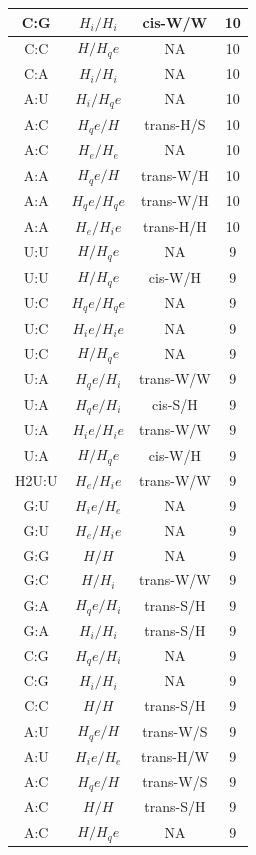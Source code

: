\begin{center}
\begin{longtable}{c|c|c|c}
C:G & $H_i/H_i$ & cis-W/W & 10 \\  \hline
C:C & $H/H_qe$ & NA & 10 \\  \hline
C:A & $H_i/H_i$ & NA & 10 \\  \hline
A:U & $H_i/H_qe$ & NA & 10 \\  \hline
A:C & $H_qe/H$ & trans-H/S & 10 \\  \hline
A:C & $H_e/H_e$ & NA & 10 \\  \hline
A:A & $H_qe/H$ & trans-W/H & 10 \\  \hline
A:A & $H_qe/H_qe$ & trans-W/H & 10 \\  \hline
A:A & $H_e/H_ie$ & trans-H/H & 10 \\  \hline
U:U & $H/H_qe$ & NA & 9 \\  \hline
U:U & $H/H_qe$ & cis-W/H & 9 \\  \hline
U:C & $H_qe/H_qe$ & NA & 9 \\  \hline
U:C & $H_ie/H_ie$ & NA & 9 \\  \hline
U:C & $H/H_qe$ & NA & 9 \\  \hline
U:A & $H_qe/H_i$ & trans-W/W & 9 \\  \hline
U:A & $H_qe/H_i$ & cis-S/H & 9 \\  \hline
U:A & $H_ie/H_ie$ & trans-W/W & 9 \\  \hline
U:A & $H/H_qe$ & cis-W/H & 9 \\  \hline
H2U:U & $H_e/H_ie$ & trans-W/W & 9 \\  \hline
G:U & $H_ie/H_e$ & NA & 9 \\  \hline
G:U & $H_e/H_ie$ & NA & 9 \\  \hline
G:G & $H/H$ & NA & 9 \\  \hline
G:C & $H/H_i$ & trans-W/W & 9 \\  \hline
G:A & $H_qe/H_i$ & trans-S/H & 9 \\  \hline
G:A & $H_i/H_i$ & trans-S/H & 9 \\  \hline
C:G & $H_qe/H_i$ & NA & 9 \\  \hline
C:G & $H_i/H_i$ & NA & 9 \\  \hline
C:C & $H/H$ & trans-S/H & 9 \\  \hline
A:U & $H_qe/H$ & trans-W/S & 9 \\  \hline
A:U & $H_ie/H_e$ & trans-H/W & 9 \\  \hline
A:C & $H_qe/H$ & trans-W/S & 9 \\  \hline
A:C & $H/H$ & trans-S/H & 9 \\  \hline
A:C & $H/H_qe$ & NA & 9 \\  \hline

\end{longtable}
\end{center}
